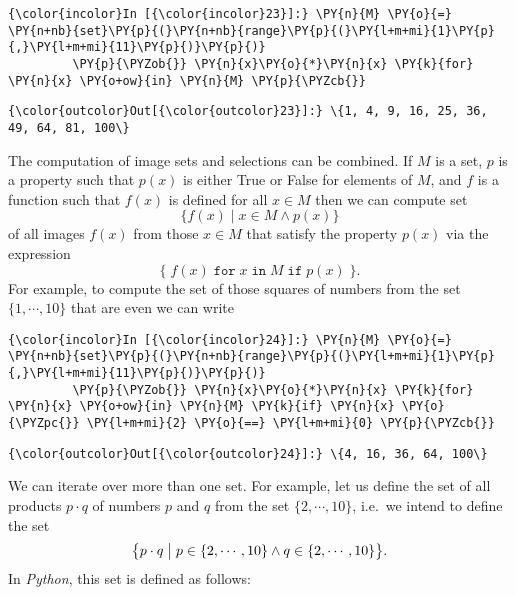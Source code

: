     \begin{Verbatim}[commandchars=\\\{\}]
{\color{incolor}In [{\color{incolor}23}]:} \PY{n}{M} \PY{o}{=} \PY{n+nb}{set}\PY{p}{(}\PY{n+nb}{range}\PY{p}{(}\PY{l+m+mi}{1}\PY{p}{,}\PY{l+m+mi}{11}\PY{p}{)}\PY{p}{)}
         \PY{p}{\PYZob{}} \PY{n}{x}\PY{o}{*}\PY{n}{x} \PY{k}{for} \PY{n}{x} \PY{o+ow}{in} \PY{n}{M} \PY{p}{\PYZcb{}}
\end{Verbatim}


\begin{Verbatim}[commandchars=\\\{\}]
{\color{outcolor}Out[{\color{outcolor}23}]:} \{1, 4, 9, 16, 25, 36, 49, 64, 81, 100\}
\end{Verbatim}
            
The computation of image sets and selections can be combined. If \(M\)
is a set, \(p\) is a property such that \(p(x)\) is either True or False
for elements of \(M\), and \(f\) is a function such that \(f(x)\) is
defined for all \(x \in M\) then we can compute set
\[ \{ f(x) \mid  x \in M \wedge p(x) \} \] of all images \(f(x)\) from
those \(x\in M\) that satisfy the property \(p(x)\) via the expression
\[ \{\; f(x)\; \texttt{for}\; x\; \texttt{in}\; M\; \texttt{if}\; p(x)\; \}. \]
For example, to compute the set of those squares of numbers from the set
\(\{1,\cdots,10\}\) that are even we can write

    \begin{Verbatim}[commandchars=\\\{\}]
{\color{incolor}In [{\color{incolor}24}]:} \PY{n}{M} \PY{o}{=} \PY{n+nb}{set}\PY{p}{(}\PY{n+nb}{range}\PY{p}{(}\PY{l+m+mi}{1}\PY{p}{,}\PY{l+m+mi}{11}\PY{p}{)}\PY{p}{)}
         \PY{p}{\PYZob{}} \PY{n}{x}\PY{o}{*}\PY{n}{x} \PY{k}{for} \PY{n}{x} \PY{o+ow}{in} \PY{n}{M} \PY{k}{if} \PY{n}{x} \PY{o}{\PYZpc{}} \PY{l+m+mi}{2} \PY{o}{==} \PY{l+m+mi}{0} \PY{p}{\PYZcb{}}
\end{Verbatim}


\begin{Verbatim}[commandchars=\\\{\}]
{\color{outcolor}Out[{\color{outcolor}24}]:} \{4, 16, 36, 64, 100\}
\end{Verbatim}
            
We can iterate over more than one set. For example, let us define the
set of all products \(p \cdot q\) of numbers \(p\) and \(q\) from the
set \(\{2, \cdots, 10\}\), i.e.~we intend to define the set
\[ \bigl\{ p \cdot q \bigm| p \in \{2,\cdots,10\} \wedge q \in \{2,\cdots,10\} \bigr\}. \]
In \textsl{Python}, this set is defined as follows:

